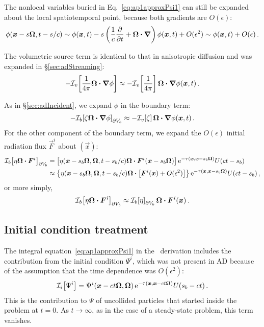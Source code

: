 The nonlocal variables buried in Eq.~\eqref{eq:ap1approxPsi1} can still be expanded
about the local spatiotemporal point, because both gradients are $O(\epsilon)$:
\begin{equation} \label{eq:ap1taylorPhi}
  \phi(\bm{x} - s \bm{\Omega}, t-s/c)
  \sim \phi(\bm{x},t) - s \left( \frac{1}{c} \frac{\partial }{\partial t} + \bm{\Omega} \bm{\cdot}
  \bm{\nabla}  \right) \phi (\bm{x}, t) + O(\epsilon^2) \sim \phi(\bm{x},t) +
  O(\epsilon) \,.
\end{equation}

The volumetric source term is identical to that in anisotropic diffusion and was
expanded in \S\ref{sec:adStreaming}:
\begin{equation*}
  - \mathcal{I}_{v}\!\left[\frac{1}{4\pi} \bm{\Omega}\bm{\cdot} \bm{\nabla} \phi\right]
  \approx  - \mathcal{I}_{v}\!\left[\frac{1}{4\pi}\right] \bm{\Omega}\bm{\cdot} \bm{\nabla}
  \phi(\bm{x},t) \,.
\end{equation*}

As in \S\ref{sec:adIncident}, we expand $\phi$ in the boundary term:
\begin{equation*}
-\mathcal{I}_{b}\!\left[\zeta \bm{\Omega}\bm{\cdot} \bm{\nabla} \phi\right]_{\partial V_b}
  \approx  - \mathcal{I}_{v}\!\left[\zeta\right] \bm{\Omega}\bm{\cdot} \bm{\nabla}
  \phi(\bm{x},t) \,.
\end{equation*}
For the other component of the boundary term, we expand the $O(\epsilon)$
initial radiation flux $\vec{F}^i$ about $(\vec{x})$:
\begin{align*} \nonumber
\mathcal{I}_{b}\!\left[\eta \bm{\Omega}\bm{\cdot} \bm{F}^i\right]_{\partial V_b}
&= \left[\eta(\bm{x} - s_b\bm{\Omega}, \bm{\Omega}, t - s_b/c)
    \bm{\Omega}\bm{\cdot} \bm{F}^i(\bm{x} - s_b\bm{\Omega}) \right]
    \mathop{}\!\mathrm{e}^{ -\tau(\bm{x}, \bm{x} - s_b \bm{\Omega})} U(ct - s_b)
    \\
&\approx \left\{\eta(\bm{x} - s_b\bm{\Omega}, \bm{\Omega}, t - s_b/c)
\bm{\Omega}\bm{\cdot} \left[
\bm{F}^i(\bm{x}) + O(\epsilon^2)\right] \right\}
  \mathop{}\!\mathrm{e}^{ -\tau(\bm{x}, \bm{x} - s_b \bm{\Omega})} U(ct - s_b)\,,
\end{align*}
or more simply,
\begin{equation*}
\mathcal{I}_{b}\!\left[\eta \bm{\Omega}\bm{\cdot} \bm{F}^i\right]_{\partial V_b}
  \approx \mathcal{I}_{b}\!\left[\eta\right]_{\partial V_b}
  \bm{\Omega}\bm{\cdot} \bm{F}^i(\bm{x}) \,.
\end{equation*}

\subsection{Initial condition treatment}\label{sec:ap1ic}
The integral equation~\eqref{eq:ap1approxPsi1} in the \APone\ derivation
includes the contribution from the initial condition $\Psi^i$, which was not
present in AD because of the assumption that the time dependence was
$O(\epsilon^2)$:
\begin{equation*}
  \mathcal{I}_{i}\!\left[\Psi^i\right] = \Psi^i( \bm{x} - ct \bm{\Omega}, \bm{\Omega})
    \mathop{}\!\mathrm{e}^{ -\tau(\bm{x}, \bm{x} - ct \bm{\Omega})} U( s_b - ct)\,.
\end{equation*}
This is the contribution to $\Psi$ of uncollided particles that started
inside the problem at $t=0$. As $t\to\infty$, as in the case of a steady-state
problem, this term vanishes.

